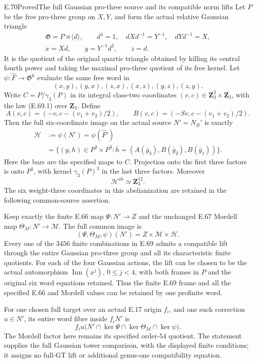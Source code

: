 \begin{statement}{E.70}{Proved}{The full Gaussian pro-three source and its compatible norm lifts}
Let $P$ be the free pro-three group on $X,Y$, and form the
actual relative Gaussian triangle
\[
 \begin{gathered}
 \mathfrak G=P\rtimes\langle d\rangle,\qquad
 d^4=1,\quad dXd^{-1}=Y^{-1},\quad dYd^{-1}=X,\\
 x=Xd,\qquad y=Y^{-1}d^2,\qquad z=d.
 \end{gathered}
 \tag{E.70.1}
\]
It is the quotient of the original quartic triangle
obtained by killing its central fourth power and taking
the maximal pro-three quotient of its free kernel.
Let $\psi:\widehat F\to\mathfrak G^6$ evaluate the same
free word in
\[
                (x,y),(y,x),(z,x),(x,z),(y,z),(z,y).
 \tag{E.70.2}
\]
Write $C=P/\gamma_3(P)$ in its integral class-two
coordinates $(v,c)\in\mathbf Z_3^2\times\mathbf Z_3$,
with the law (E.69.1) over $\mathbf Z_3$. Define
\[
 A(v,c)=(-v,c-(v_1+v_2)/2),\qquad
 B(v,c)=(-Sv,c-(v_1+v_2)/2).
 \tag{E.70.3}
\]
Then the full six-coordinate image on the actual source
$N'=N_B'$ is exactly
\[
 \begin{aligned}
 \mathscr H&:=\psi(N')=\psi(\widehat F')\\
 &=\{(g,h)\in P^3\times P^3:
       \overline h=(A(\overline g_3),B(\overline g_2),B(\overline g_1))\}.
 \end{aligned}
 \tag{E.70.4}
\]
Here the bars are the specified maps to $C$. Projection
onto the first three factors is onto $P^3$, with kernel
$\gamma_3(P)^3$ in the last three factors. Moreover
\[
             \mathscr H^{\mathrm{ab}}\simeq\mathbf Z_3^{12}.
 \tag{E.70.5}
\]
The six weight-three coordinates in this abelianization
are retained in the following common-source assertion.

Keep exactly the finite E.66 map $\Psi:N'\to Z$ and
the unchanged E.67 Mordell map $\Theta_M:N'\to\mathcal M$.
The full common image is
\[
       (\Psi,\Theta_M,\psi)(N')
            =Z\times\mathcal M\times\mathscr H.
 \tag{E.70.6}
\]
Every one of the $3456$ finite combinations in E.69
admits a compatible lift through the entire Gaussian
pro-three group and all its characteristic finite
quotients. For each of the four Gaussian actions, the
lift can be chosen to be the actual automorphism
$\operatorname{Inn}(x^j)$, $0\leq j<4$, with both
frames in $P$ and the original six word equations
retained. Thus the finite E.69 frame and all the
specified E.66 and Mordell values can be retained by
one profinite word.

For one chosen full target over an actual E.17 origin
$f_i$, and one such correction $u\in N'$, its entire
word fibre inside $f_iN'$ is
\[
 f_i u\bigl(N'\cap\ker\Psi\cap\ker\Theta_M\cap\ker\psi\bigr).
 \tag{E.70.7}
\]
The Mordell factor here remains its specified order-$54$
quotient. The statement supplies the full Gaussian
tower comparison, with the displayed finite conditions;
it assigns no full-GT lift or additional genus-one
compatibility equation.
\end{statement}
